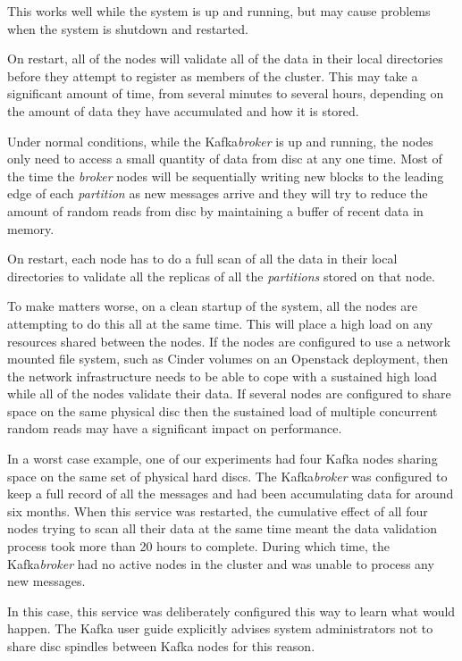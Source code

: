 \documentclass{article}
\newcommand{\openstack} {Openstack\xspace}
\newcommand{\kafka} {Kafka\xspace}
\newcommand{\kfbroker} {\textit{broker}\xspace}
\newcommand{\kfpartition} {\textit{partition}\xspace}
\newcommand{\kfpartitions} {\textit{partitions}\xspace}
\begin{document}
This works well while the system is up and running, but may cause problems when the system is shutdown and restarted.

On restart, all of the nodes will validate all of the data in their local directories before they attempt to register as members of the cluster.
This may take a significant amount of time, from several minutes to several hours, depending on the amount of data they have accumulated and how it is stored.

Under normal conditions, while the \kafka \kfbroker is up and running, the nodes only need to access a small quantity of data from disc at any one time. 
Most of the time the \kfbroker nodes will be sequentially writing new blocks to the leading edge of each \kfpartition as new messages arrive and they will try to reduce the amount of random reads from disc by maintaining a buffer of recent data in memory.

On restart, each node has to do a full scan of all the data in their local directories to validate all the replicas of all the \kfpartitions stored on that node.

To make matters worse, on a clean startup of the system, all the nodes are attempting to do this all at the same time. This will place a high load on any resources shared between the nodes.
If the nodes are configured to use a network mounted file system, such as Cinder volumes on an \openstack deployment, then the network infrastructure needs to be able to cope with a sustained high load while all of the nodes validate their data.
If several nodes are configured to share space on the same physical disc then the sustained load of multiple concurrent random reads may have a significant impact on performance.

In a worst case example, one of our experiments had four \kafka nodes sharing space on the same set of physical hard discs. The \kafka \kfbroker was configured to keep a full record of all the messages and had been accumulating data for around six months.
When this service was restarted, the cumulative effect of all four nodes trying to scan all their data at the same time meant the data validation process took more than 20 hours to complete.
During which time, the \kafka \kfbroker had no active nodes in the cluster and was unable to process any new messages.

In this case, this service was deliberately configured this way to learn what would happen.
The \kafka user guide explicitly advises system administrators not to share disc spindles between \kafka nodes for this reason.
\end{document}
